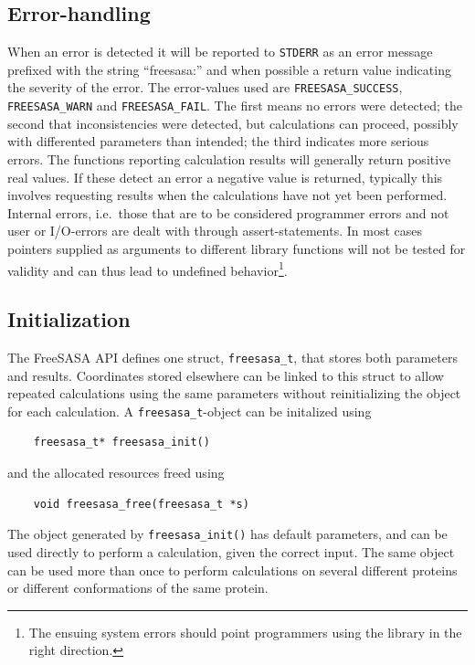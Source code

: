 \documentclass[a4paper,11pt]{article}
\begin{document}
\subsection{Error-handling}

When an error is detected it will be reported to \verb|STDERR| as an error
message prefixed with the string ``freesasa:'' and when possible a
return value indicating the severity of the error. The error-values
used are \verb|FREESASA_SUCCESS|, \verb|FREESASA_WARN| and
\verb|FREESASA_FAIL|. The first means no errors were detected; the
second that inconsistencies were detected, but calculations can
proceed, possibly with differented parameters than intended; the third
indicates more serious errors. The functions reporting calculation
results will generally return positive real values. If these detect an
error a negative value is returned, typically this involves requesting
results when the calculations have not yet been performed.  Internal
errors, i.e.\ those that are to be considered programmer errors and
not user or I/O-errors are dealt with through assert-statements. In
most cases pointers supplied as arguments to different library
functions will not be tested for validity and can thus lead to
undefined behavior\footnote{The ensuing system errors should point
  programmers using the library in the right direction.}.

\subsection{Initialization}

The FreeSASA API defines one struct, \verb|freesasa_t|, that stores both
parameters and results. Coordinates stored elsewhere can be linked to
this struct to allow repeated calculations using the same parameters
without reinitializing the object for each calculation. A
\verb|freesasa_t|-object can be initalized using
\begin{verbatim}
    freesasa_t* freesasa_init()
\end{verbatim}
and the allocated resources freed using
\begin{verbatim}
    void freesasa_free(freesasa_t *s)
\end{verbatim}
The object generated by \verb|freesasa_init()| has default parameters,
and can be used directly to perform a calculation, given the correct
input. The same object can be used more than once to perform
calculations on several different proteins or different conformations
of the same protein.
\end{document}
